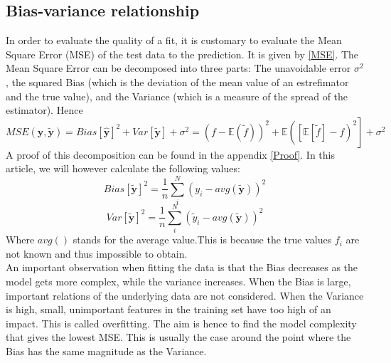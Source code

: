 \documentclass[11pt,a4paper,titlepage]{article}
\begin{document}
\subsection{Bias-variance relationship}
In order to evaluate the quality of a fit, it is customary to evaluate the Mean Square Error (MSE) of the test data to the prediction. It is given by \ref{MSE}.
The Mean Square Error can be decomposed into three parts: The unavoidable error $\sigma^2$, the squared Bias (which is the deviation of the mean value of an estrefimator and the true value), and the Variance (which is a measure of the spread of the estimator). Hence
\begin{equation*}
MSE(\bm{y},\bm{\tilde y})=Bias[ \bm{\hat y}]^2 + Var[ \bm{\tilde y}]+\sigma^2= \left(f-\mathbb{E}(\tilde f)\right)^2 + \mathbb{E}\left(\left[\mathbb{E}\left[ \tilde f \right]-f\right)^2 \right]+\sigma^2
\end{equation*}
A proof of this decomposition can be found in the appendix \eqref{Proof}.
In this article, we will however calculate the following values:
\begin{equation*}
Bias[\bm{\tilde y}]^2=\frac{1}{n}\sum_i^N\left( y_i - avg( \bm{\tilde y})\right)^2
\end{equation*}
\begin{equation*}
Var[\bm{\tilde y}]^2=\frac{1}{n}\sum_i^N\left(\tilde y_i - avg( \bm{\tilde y})\right)^2
\end{equation*}
Where $avg()$ stands for the average value.This is because the true values $f_i$ are not known and thus impossible to obtain.\\
An important observation when fitting the data is that the Bias decreases as the model gets more complex, while the variance increases. When the Bias is large, important relations of the underlying data are not considered. When the Variance is high, small, unimportant features in the training set have too high of an impact. This is called overfitting. The aim is hence to find the model complexity that gives the lowest MSE. This is usually the case around the point where the Bias has the same magnitude as the Variance.
\end{document}
